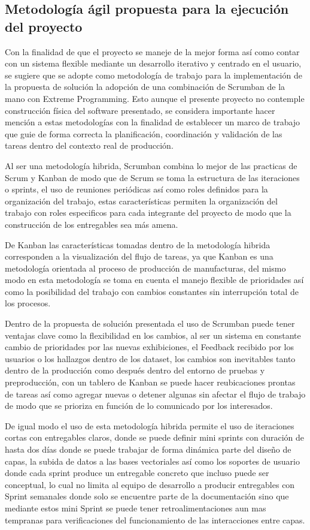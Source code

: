 \documentclass[pdflatex,sn-mathphys-num]{sn-jnl}%
\theoremstyle{thmstyleone}%
\theoremstyle{thmstyletwo}%
\theoremstyle{thmstylethree}%
\begin{document}
\subsection{Metodología ágil propuesta para la ejecución del proyecto}

Con la finalidad de que el proyecto se maneje de la mejor forma así como contar con un sistema flexible mediante un desarrollo iterativo y centrado en el usuario, se sugiere que se adopte como metodología de trabajo para la implementación de la propuesta de solución la adopción de una combinación de Scrumban de la mano con Extreme Programming. Esto aunque el presente proyecto no contemple construcción física del software presentado, se considera importante hacer mención a estas metodologías con la finalidad de establecer un marco de trabajo que guie de forma correcta la planificación, coordinación y validación de las tareas dentro del contexto real de producción.

Al ser una metodología hibrida, Scrumban combina lo mejor de las practicas de Scrum y Kanban de modo que de Scrum se toma la estructura de las iteraciones o sprints, el uso de reuniones periódicas así como roles definidos para la organización del trabajo, estas características permiten la organización del trabajo con roles especificos para cada integrante del proyecto de modo que la construcción de los entregables sea más amena.

De Kanban las características tomadas dentro de la metodología hibrida corresponden a la visualización del flujo de tareas, ya que Kanban es una metodología orientada al proceso de producción de manufacturas, del mismo modo en esta metodología se toma en cuenta el manejo flexible de prioridades así como la posibilidad del trabajo con cambios constantes sin interrupción total de los procesos.

Dentro de la propuesta de solución presentada el uso de Scrumban puede tener ventajas clave como la flexibilidad en los cambios, al ser un sistema en constante cambio de prioridades por las nuevas exhibiciones, el Feedback recibido por los usuarios o los hallazgos dentro de los dataset, los cambios son inevitables tanto dentro de la producción como después dentro del entorno de pruebas y preproducción, con un tablero de Kanban se puede hacer reubicaciones prontas de tareas así como agregar nuevas o detener algunas sin afectar el flujo de trabajo de modo que se prioriza en función de lo comunicado por los interesados.

De igual modo el uso de esta metodología hibrida permite el uso de iteraciones cortas con entregables claros, donde se puede definir mini sprints con duración de hasta dos días donde se puede trabajar de forma dinámica parte del diseño de capas, la subida de datos a las bases vectoriales así como los soportes de usuario donde cada sprint produce un entregable concreto que incluso puede ser conceptual, lo cual no limita al equipo de desarrollo a producir entregables con Sprint semanales donde solo se encuentre parte de la documentación sino que mediante estos mini Sprint se puede tener retroalimentaciones aun mas tempranas para verificaciones del funcionamiento de las interacciones entre capas.
\end{document}
